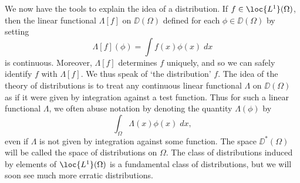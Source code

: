 
We now have the tools to explain the idea of a distribution. If $f \in \loc{L^1}(\Omega)$, then the linear functional $\Lambda[f]$ on $\DD(\Omega)$ defined for each $\phi \in \DD(\Omega)$ by setting
%
\[ \Lambda[f](\phi) = \int f(x) \phi(x)\; dx \]
%
is continuous. Moreover, $\Lambda[f]$ determines $f$ uniquely, and so we can safely identify $f$ with $\Lambda[f]$. We thus speak of `the distribution' $f$. The idea of the theory of distributions is to treat any continuous linear functional $\Lambda$ on $\DD(\Omega)$ as if it were given by integration against a test function. Thus for such a linear functional $\Lambda$, we often abuse notation by denoting the quantity $\Lambda(\phi)$ by
%
\[ \int_\Omega \Lambda(x) \phi(x)\; dx, \]
%
even if $\Lambda$ is not given by integration against some function. The space $\DD^*(\Omega)$ will be called the space of distributions on $\Omega$. The class of distributions induced by elements of $\loc{L^1}(\Omega)$ is a fundamental class of distributions, but we will soon see much more erratic distributions.

